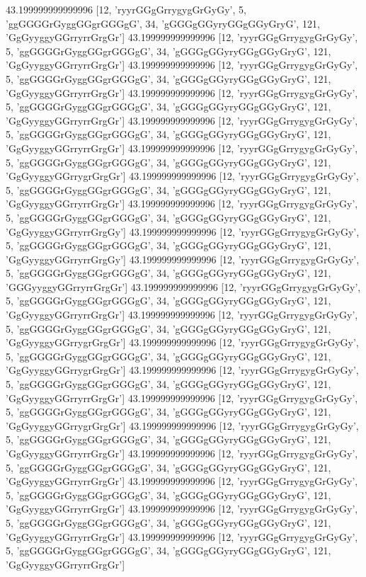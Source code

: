 43.199999999999996 [12, 'ryyrGGgGrrygygGrGyGy', 5, 'ggGGGGrGyggGGgrGGGgG', 34, 'gGGGgGGyryGGgGGyGryG', 121, 'GgGyyggyGGrryrrGrgGr']
43.199999999999996 [12, 'ryyrGGgGrrygygGrGyGy', 5, 'ggGGGGrGyggGGgrGGGgG', 34, 'gGGGgGGyryGGgGGyGryG', 121, 'GgGyyggyGGrryrrGrgGr']
43.199999999999996 [12, 'ryyrGGgGrrygygGrGyGy', 5, 'ggGGGGrGyggGGgrGGGgG', 34, 'gGGGgGGyryGGgGGyGryG', 121, 'GgGyyggyGGrryrrGrgGr']
43.199999999999996 [12, 'ryyrGGgGrrygygGrGyGy', 5, 'ggGGGGrGyggGGgrGGGgG', 34, 'gGGGgGGyryGGgGGyGryG', 121, 'GgGyyggyGGrryrrGrgGr']
43.199999999999996 [12, 'ryyrGGgGrrygygGrGyGy', 5, 'ggGGGGrGyggGGgrGGGgG', 34, 'gGGGgGGyryGGgGGyGryG', 121, 'GgGyyggyGGrryrrGrgGr']
43.199999999999996 [12, 'ryyrGGgGrrygygGrGyGy', 5, 'ggGGGGrGyggGGgrGGGgG', 34, 'gGGGgGGyryGGgGGyGryG', 121, 'GgGyyggyGGrrygrGrgGr']
43.199999999999996 [12, 'ryyrGGgGrrygygGrGyGy', 5, 'ggGGGGrGyggGGgrGGGgG', 34, 'gGGGgGGyryGGgGGyGryG', 121, 'GgGyyggyGGrryrrGrgGr']
43.199999999999996 [12, 'ryyrGGgGrrygygGrGyGy', 5, 'ggGGGGrGyggGGgrGGGgG', 34, 'gGGGgGGyryGGgGGyGryG', 121, 'GgGyyggyGGrryrrGrgGy']
43.199999999999996 [12, 'ryyrGGgGrrygygGrGyGy', 5, 'ggGGGGrGyggGGgrGGGgG', 34, 'gGGGgGGyryGGgGGyGryG', 121, 'GgGyyggyGGrryrrGrgGy']
43.199999999999996 [12, 'ryyrGGgGrrygygGrGyGy', 5, 'ggGGGGrGyggGGgrGGGgG', 34, 'gGGGgGGyryGGgGGyGryG', 121, 'GGGyyggyGGrryrrGrgGr']
43.199999999999996 [12, 'ryyrGGgGrrygygGrGyGy', 5, 'ggGGGGrGyggGGgrGGGgG', 34, 'gGGGgGGyryGGgGGyGryG', 121, 'GgGyyggyGGrryrrGrgGr']
43.199999999999996 [12, 'ryyrGGgGrrygygGrGyGy', 5, 'ggGGGGrGyggGGgrGGGgG', 34, 'gGGGgGGyryGGgGGyGryG', 121, 'GgGyyggyGGrrygrGrgGr']
43.199999999999996 [12, 'ryyrGGgGrrygygGrGyGy', 5, 'ggGGGGrGyggGGgrGGGgG', 34, 'gGGGgGGyryGGgGGyGryG', 121, 'GgGyyggyGGrrygrGrgGr']
43.199999999999996 [12, 'ryyrGGgGrrygygGrGyGy', 5, 'ggGGGGrGyggGGgrGGGgG', 34, 'gGGGgGGyryGGgGGyGryG', 121, 'GgGyyggyGGrryrrGrgGr']
43.199999999999996 [12, 'ryyrGGgGrrygygGrGyGy', 5, 'ggGGGGrGyggGGgrGGGgG', 34, 'gGGGgGGyryGGgGGyGryG', 121, 'GgGyyggyGGrrygrGrgGr']
43.199999999999996 [12, 'ryyrGGgGrrygygGrGyGy', 5, 'ggGGGGrGyggGGgrGGGgG', 34, 'gGGGgGGyryGGgGGyGryG', 121, 'GgGyyggyGGrryrrGrgGr']
43.199999999999996 [12, 'ryyrGGgGrrygygGrGyGy', 5, 'ggGGGGrGyggGGgrGGGgG', 34, 'gGGGgGGyryGGgGGyGryG', 121, 'GgGyyggyGGrryrrGrgGr']
43.199999999999996 [12, 'ryyrGGgGrrygygGrGyGy', 5, 'ggGGGGrGyggGGgrGGGgG', 34, 'gGGGgGGyryGGgGGyGryG', 121, 'GgGyyggyGGrryrrGrgGr']
43.199999999999996 [12, 'ryyrGGgGrrygygGrGyGy', 5, 'ggGGGGrGyggGGgrGGGgG', 34, 'gGGGgGGyryGGgGGyGryG', 121, 'GgGyyggyGGrryrrGrgGr']
43.199999999999996 [12, 'ryyrGGgGrrygygGrGyGy', 5, 'ggGGGGrGyggGGgrGGGgG', 34, 'gGGGgGGyryGGgGGyGryG', 121, 'GgGyyggyGGrryrrGrgGr']
